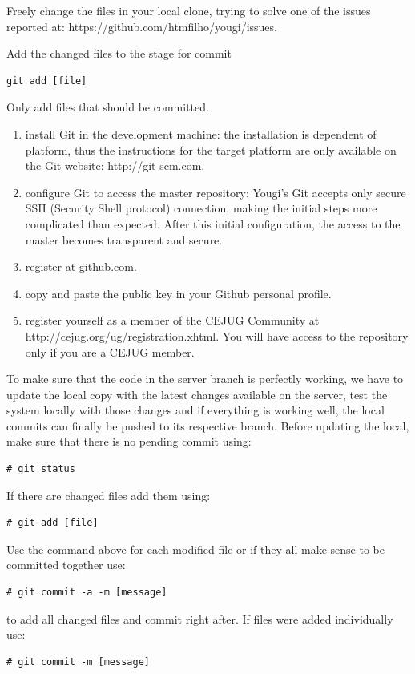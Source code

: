 \documentclass[envcountsame,envcountchap]{svmono}
\begin{document}
Freely change the files in your local clone, trying to solve one of the issues reported at: https://github.com/htmfilho/yougi/issues.

Add the changed files to the stage for commit

\begin{verbatim}
git add [file]
\end{verbatim}

Only add files that should be committed.



\begin{enumerate}
\item install Git in the development machine: the installation is dependent of platform, thus the instructions for the target platform are only available on the Git website: http://git-scm.com.
\item configure Git to access the master repository: Yougi's Git accepts only secure SSH (Security Shell protocol) connection, making the initial steps more complicated than expected. After this initial configuration, the access to the master becomes transparent and secure.
\item register at github.com.
\item copy and paste the public key in your Github personal profile.
\item register yourself as a member of the CEJUG Community at \\ http://cejug.org/ug/registration.xhtml. You will have access to the repository only if you are a CEJUG member.
\end{enumerate}

To make sure that the code in the server branch is perfectly working, we have to update the local copy with the latest changes available on the server, test the system locally with those changes and if everything is working well, the local commits can finally be pushed to its respective branch. Before updating the local, make sure that there is no pending commit using:
\begin{verbatim}
# git status
\end{verbatim}
If there are changed files add them using:
\begin{verbatim}
# git add [file]
\end{verbatim}
Use the command above for each modified file or if they all make sense to be committed together use:
\begin{verbatim}
# git commit -a -m [message]
\end{verbatim}
to add all changed files and commit right after. If files were added individually use:
\begin{verbatim}
# git commit -m [message]
\end{verbatim}
\end{document}
